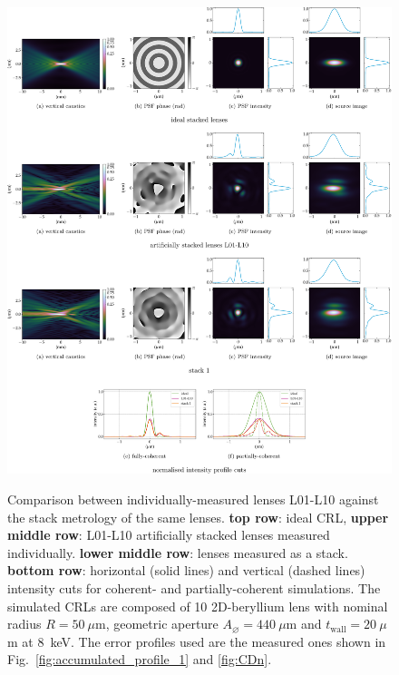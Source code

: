 \begin{refsection}
\begin{figure}[ht]
        \centering
        {\includegraphics[width=1\linewidth]{figures/ch05/CDn_vs_CDnStack.pdf}}
        \caption[Artificially stacked lenses L01-L11 vs. stack 1 comparison]{Comparison between individually-measured lenses L01-L10 against the stack metrology of the same lenses. \textbf{top row}: ideal CRL, \textbf{upper middle row}: L01-L10 artificially stacked lenses measured individually. \textbf{lower middle row}: lenses measured as a stack. \textbf{bottom row}: horizontal (solid lines) and vertical (dashed lines) intensity cuts for coherent- and partially-coherent simulations. The simulated CRLs are composed of 10 2D-beryllium lens with nominal radius $R=50~\mu\text{m}$, geometric aperture $A_{\diameter}=440~\mu\text{m}$ and $t_\text{wall}=20~\mu$m at 8~keV. The error profiles used are the measured ones shown in Fig.~\ref{fig:accumulated_profile_1} and \ref{fig:CDn}.}\label{fig:CDn_vs_CDnStack}
\end{figure}


\end{refsection}
